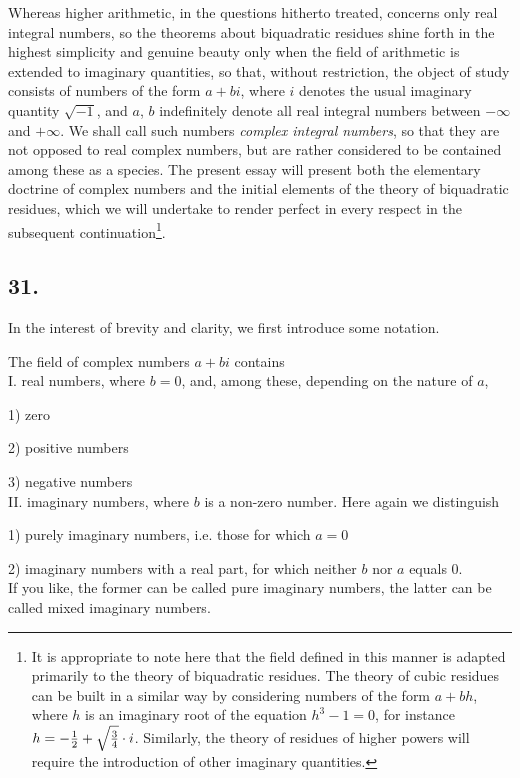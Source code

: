\documentclass[twoside,12pt]{memoir}
\let\oldfrac\frac
\def\frac#1#2{\mathchoice{\tfrac{#1}{#2}}{\oldfrac{#1}{#2}}{\genfrac{}{}{}{2}{#1}{#2\mathstrut}}{\genfrac{}{}{}{3}{#1}{#2\mathstrut}}}
\begin{document}
Whereas higher arithmetic, in the questions hitherto treated, concerns only real integral numbers, so the theorems about biquadratic residues shine forth in the highest simplicity and genuine beauty only when the field of arithmetic is extended to imaginary quantities, so that, without restriction, the object of study consists of numbers of the form \(a+b i\), where \(i\) denotes the usual imaginary quantity \(\sqrt{-1}\), and \(a\), \(b\) indefinitely denote all real integral numbers between \(-\infty\) and \(+\infty\). We shall call such numbers \textit{complex integral numbers}, so that they are not opposed to real complex numbers, but are rather considered to be contained among these as a species. The present essay will present both the elementary doctrine of complex numbers and the initial elements of the theory of biquadratic residues, which we will undertake to render perfect in every respect in the subsequent continuation\footnote{It is appropriate to note here that the field defined in this manner is adapted primarily to the theory of biquadratic residues. The theory of cubic residues can be built in a similar way by considering numbers of the form \(a+b h\), where \(h\) is an imaginary root of the equation \(h^{3}-1=0\), for instance \(h=-\frac{1}{2}+\sqrt{\frac{3}{4}} \cdot i\).  Similarly, the theory of residues of higher powers will require the introduction of other imaginary quantities.}.

\subsection*{31.}

In the interest of brevity and clarity, we first introduce some notation.

The field of complex numbers \(a+bi\) contains\\
I. real numbers, where \(b=0\), and, among these, depending on the nature of \(a\),

1) zero

2) positive numbers

3) negative numbers\\
II. imaginary numbers, where \(b\) is a non-zero number. Here again we distinguish

1) purely imaginary numbers, i{.}e{.} those for which \(a=0\)

2) imaginary numbers with a real part, for which neither \(b\) nor \(a\) equals 0.\\
If you like, the former can be called pure imaginary numbers, the latter can be called mixed imaginary numbers.\pagebreak%
\end{document}

